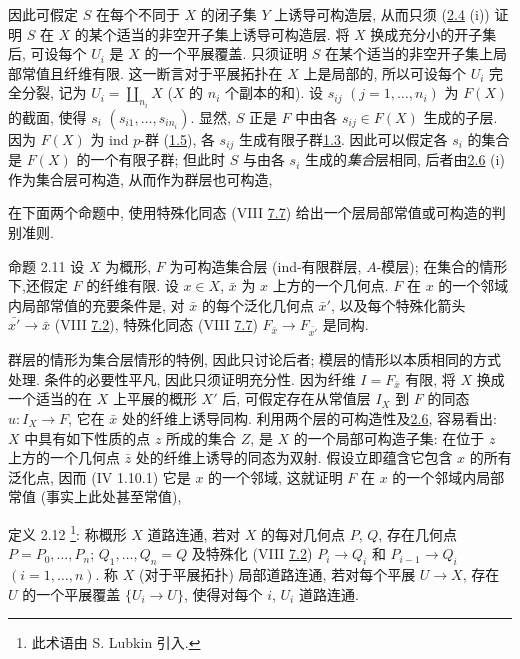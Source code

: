 因此可假定 $S$ 在每个不同于 $X$ 的闭子集 $Y$ 上诱导可构造层,
从而只须 (\hyperref[IX.prop2.4]{2.4} (i))
证明 $S$ 在 $X$ 的某个适当的非空开子集上诱导可构造层.
将 $X$ 换成充分小的开子集后, 可设每个 $U_i$ 是 $X$ 的一个平展覆盖.
只须证明 $S$ 在某个适当的非空开子集上局部常值且纤维有限.
这一断言对于平展拓扑在 $X$ 上是局部的,
所以可设每个 $U_i$ 完全分裂, 记为 $U_i=\amalg_{n_i}X$
($X$ 的 $n_i$ 个副本的和).
设 $s_{ij}$ $(j=1,\ldots,n_i)$ 为 $F(X)$ 的截面,
使得 $s_i$ $(s_{i1},\ldots,s_{in_i})$.
显然, $S$ 正是 $F$ 中由各 $s_{ij}\in F(X)$ 生成的子层.
因为 $F(X)$ 为 ind $p$-群 (\hyperref[IX.def1.5]{1.5}),
各 $s_{ij}$ 生成有限子群\hyperref[IX.def1.3]{1.3}.
因此可以假定各 $s_i$ 的集合是 $F(X)$ 的一个有限子群;
但此时 $S$ 与由各 $s_i$ 生成的\emph{集合}层相同,
后者由\hyperref[IX.prop2.6]{2.6} (i) 作为集合层可构造,
从而作为群层也可构造, \cqfd

在下面两个命题中, 使用特殊化同态
(VIII \hyperref[VIII.subsec7.7]{7.7}) 给出一个层局部常值或可构造的判别准则.

\begin{enonce*}{命题 2.11}
设 $X$ 为概形, $F$ 为可构造集合层
(\resp ind-有限群层, \resp $A$-模层);
在集合的情形下,\pageoriginale 还假定 $F$ 的纤维有限.
设 $x\in X$, $\bar{x}$ 为 $x$ 上方的一个几何点.
$F$ 在 $x$ 的一个邻域内局部常值的充要条件是,
对 $\bar{x}$ 的每个泛化几何点 $\bar{x}'$,
以及每个特殊化箭头 $\bar{x'}\rightarrow \bar{x}$
{\rm (VIII \hyperref[VIII.def7.2]{7.2})},
特殊化同态 {\rm (VIII \hyperref[VIII.subsec7.7]{7.7})}
$F_{\bar{x}}\rightarrow F_{\bar{x'}}$ 是同构.
\end{enonce*}

群层的情形为集合层情形的特例, 因此只讨论后者;
模层的情形以本质相同的方式处理.
条件的必要性平凡, 因此只须证明充分性.
因为纤维 $I=F_{\bar{x}}$ 有限,
将 $X$ 换成一个适当的在 $X$ 上平展的概形 $X'$ 后,
可假定存在从常值层 $I_X$ 到 $F$ 的同态 $u:I_X\rightarrow F$,
它在 $\bar{x}$ 处的纤维上诱导同构.
利用两个层的可构造性及\hyperref[IX.prop2.6]{2.6}, 容易看出:
$X$ 中具有如下性质的点 $z$ 所成的集合 $Z$, 是 $X$ 的一个局部可构造子集:
在位于 $z$ 上方的一个几何点 $\bar{z}$ 处的纤维上诱导的同态为双射.
假设立即蕴含它包含 $x$ 的所有泛化点,
因而 (\EGA IV 1.10.1) 它是 $x$ 的一个邻域,
这就证明 $F$ 在 $x$ 的一个邻域内局部常值 (事实上此处甚至常值),\cqfd

\begin{enonce*}{定义 2.12}
\footnote[1]{此术语由 S. Lubkin 引入.}:
称概形 $X$ 道路连通, 若对 $X$ 的每对几何点 $P$, $Q$,
存在几何点 $P=P_0,\ldots,P_n$; $Q_1,\ldots,Q_n=Q$
及特殊化 {\rm (VIII \hyperref[VIII.def7.2]{7.2})}
$P_i\rightarrow Q_i$ 和 $P_{i-1}\rightarrow Q_i$ $(i=1,\ldots,n)$.
称 $X$ (对于平展拓扑) 局部道路连通,
若对每个平展 $U\rightarrow X$, 存在 $U$ 的一个平展覆盖
$\{U_i\rightarrow U\}$, 使得对每个 $i$, $U_i$ 道路连通.
\end{enonce*}

